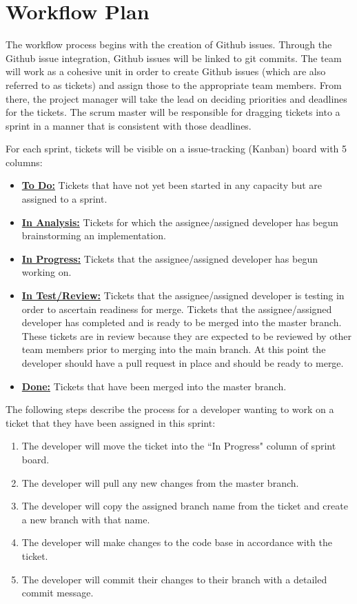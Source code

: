 \documentclass{article}
\begin{document}
\section{Workflow Plan}

The workflow process begins with the creation of Github issues. Through the Github issue integration, Github issues will be linked to git commits.
The team will work as a cohesive unit in order to create
Github issues (which are also referred to as tickets) and assign those to the appropriate team members.
From there, the project manager will take the lead on deciding priorities and deadlines for the tickets.
The scrum master will be responsible for dragging tickets into a sprint in a manner that is consistent with those deadlines.

For each sprint, tickets will be visible on a issue-tracking (Kanban) board with 5 columns:

\begin{itemize}
	\item \textbf{\underline{To Do:}} Tickets that have not yet been started in any capacity but are assigned to a sprint.
	\item \textbf{\underline{In Analysis:}} Tickets for which the assignee/assigned developer has begun brainstorming an implementation.
	\item \textbf{\underline{In Progress:}} Tickets that the assignee/assigned developer has begun working on.
	\item \textbf{\underline{In Test/Review:}} Tickets that the assignee/assigned developer is testing in order to ascertain readiness for merge.
	      Tickets that the assignee/assigned developer has completed and is ready to be merged into the master branch.
	      These tickets are in review because they are expected to be reviewed by other team members prior to merging into the main branch.
	      At this point the developer should have a pull request in place and should be ready to merge.
	\item \textbf{\underline{Done:}} Tickets that have been merged into the master branch.
\end{itemize}


The following steps describe the process for a developer wanting to work on a ticket that they have been assigned in this sprint:
\begin{enumerate}
	\item The developer will move the ticket into the ``In Progress" column of sprint board.
	\item The developer will pull any new changes from the master branch.
	\item The developer will copy the assigned branch name from the ticket and create a new branch with that name.
	\item The developer will make changes to the code base in accordance with the ticket.
	\item The developer will commit their changes to their branch with a detailed commit message.
\end{enumerate}
\end{document}
